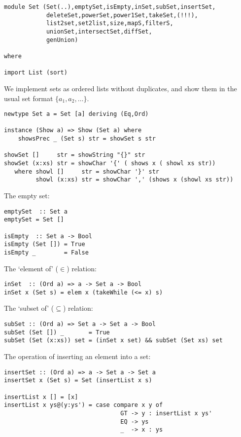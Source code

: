 \bc\begin{verbatim} 
module Set (Set(..),emptySet,isEmpty,inSet,subSet,insertSet,
            deleteSet,powerSet,power1Set,takeSet,(!!!),
            list2set,set2list,size,mapS,filterS,
            unionSet,intersectSet,diffSet, 
            genUnion)

where

import List (sort) 
\end{verbatim}\ec

We implement sets as ordered lists without duplicates, and 
show them in the usual set format $\{ a_1, a_2, \ldots \}$. 

\bc\begin{verbatim} 
newtype Set a = Set [a] deriving (Eq,Ord)

instance (Show a) => Show (Set a) where
    showsPrec _ (Set s) str = showSet s str

showSet []     str = showString "{}" str
showSet (x:xs) str = showChar '{' ( shows x ( showl xs str))
   where showl []     str = showChar '}' str
         showl (x:xs) str = showChar ',' (shows x (showl xs str))
\end{verbatim}\ec

The empty set: 

\bc\begin{verbatim} 
emptySet  :: Set a       
emptySet = Set []

isEmpty  :: Set a -> Bool            
isEmpty (Set []) = True
isEmpty _        = False
\end{verbatim}\ec

The `element of' ($\in$) relation: 

\bc\begin{verbatim}
inSet  :: (Ord a) => a -> Set a -> Bool  
inSet x (Set s) = elem x (takeWhile (<= x) s)
\end{verbatim}\ec

The `subset of' ($\subseteq$) relation: 

\bc\begin{verbatim}
subSet :: (Ord a) => Set a -> Set a -> Bool
subSet (Set []) _       = True  
subSet (Set (x:xs)) set = (inSet x set) && subSet (Set xs) set 
\end{verbatim}\ec

The operation of inserting an element into a set: 

\bc\begin{verbatim} 
insertSet :: (Ord a) => a -> Set a -> Set a 
insertSet x (Set s) = Set (insertList x s) 

insertList x [] = [x]
insertList x ys@(y:ys') = case compare x y of 
                                 GT -> y : insertList x ys' 
                                 EQ -> ys 
                                 _  -> x : ys 
\end{verbatim}\ec

